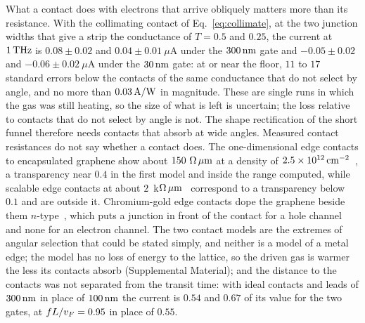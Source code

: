 What a contact does with electrons that arrive obliquely matters more
than its resistance. With the collimating contact of
Eq.~\eqref{eq:collimate}, at the two junction widths that give a strip
the conductance of $T=0.5$ and $0.25$, the current at $1\,\mathrm{THz}$ is
$0.08\pm0.02$ and $0.04\pm0.01\ \mu$A under the $300\,\mathrm{nm}$ gate and
$-0.05\pm0.02$ and $-0.06\pm0.02\ \mu$A under the $30\,\mathrm{nm}$ gate: at or
near the floor, $11$ to $17$ standard errors below the contacts of the same
conductance that do not select by angle, and no more than $0.03\,\mathrm{A/W}$ in
magnitude. These are single runs in which the gas was still heating, so the size of what is left is uncertain; the loss relative to
contacts that do not select by angle is not. The shape rectification of
the short funnel therefore needs
contacts that absorb at wide angles. Measured contact resistances do not
say whether a contact does. The one-dimensional edge contacts to
encapsulated graphene show about $150\ \Omega\um$ at a density of
$2.5\times10^{12}\,\mathrm{cm^{-2}}$~\cite{wang2013one}, a transparency near $0.4$
in the first model and inside the range computed, while scalable edge
contacts at about $2$~k$\Omega\,\mu\mathrm{m}$~\cite{pandey2018all} correspond to a
transparency below $0.1$ and are outside it. Chromium-gold edge contacts
dope the graphene beside them $n$-type~\cite{handschin2017fabry}, which
puts a junction in front of the contact for a hole channel and none for
an electron channel. The two contact models
are the extremes of angular selection that could be stated simply, and
neither is a model of a metal edge; the model has no loss of energy to
the lattice, so the driven gas is warmer the less its contacts absorb
(Supplemental Material); and the distance to the contacts was
not separated from the transit time: with ideal contacts and leads of
$300\,\mathrm{nm}$ in place of $100\,\mathrm{nm}$ the current is $0.54$ and $0.67$ of its
value for the two gates, at $fL/v_{F}=0.95$ in place of $0.55$.

